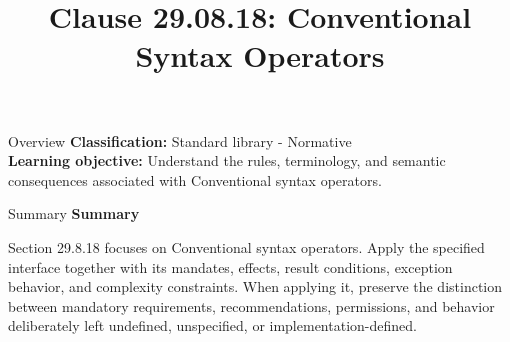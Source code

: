 \documentclass[10pt,letterpaper]{article}
\title{Clause 29.08.18: Conventional Syntax Operators}
\author{}
\date{}
\begin{document}
\maketitle
\begin{CornellOverviewBox}{Overview}
\textbf{Classification:} Standard library - Normative\\[2pt]
\textbf{Learning objective:} Understand the rules, terminology, and semantic consequences associated with Conventional syntax operators.
\end{CornellOverviewBox}\begin{CornellSummaryBox}{Summary}
{\sffamily\bfseries\color{Accent} Summary}\par\vspace{3pt}Section 29.8.18 focuses on Conventional syntax operators. Apply the specified interface together with its mandates, effects, result conditions, exception behavior, and complexity constraints. When applying it, preserve the distinction between mandatory requirements, recommendations, permissions, and behavior deliberately left undefined, unspecified, or implementation-defined.
\end{CornellSummaryBox}
\end{document}
